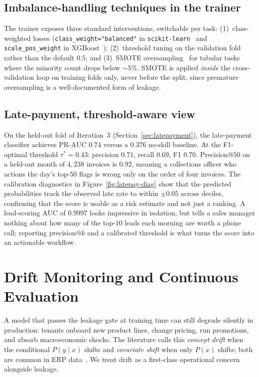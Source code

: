 \documentclass[conference]{IEEEtran}
\begin{document}
\subsection{Imbalance-handling techniques in the trainer}
The trainer exposes three standard interventions, switchable per task:
(1)~class-weighted losses (\texttt{class\_weight="balanced"} in
\texttt{scikit-learn}~\cite{pedregosa2011sklearn} and
\texttt{scale\_pos\_weight} in XGBoost~\cite{chen2016xgboost});
(2)~threshold tuning on the validation fold rather than the default $0.5$;
and (3)~SMOTE oversampling~\cite{chawla2002smote} for tabular tasks where
the minority count drops below $\sim$$5\%$. SMOTE is applied \emph{inside}
the cross-validation loop on training folds only, never before the split,
since premature oversampling is a well-documented form of leakage.

\subsection{Late-payment, threshold-aware view}
On the held-out fold of Iteration~3 (Section~\ref{sec:latepayment}), the
late-payment classifier achieves PR-AUC $0.74$ versus a $0.376$ no-skill
baseline. At the F1-optimal threshold $\tau^{*}=0.43$: precision $0.71$,
recall $0.69$, F1 $0.70$. Precision@$50$ on a held-out month of $4{,}238$
invoices is $0.92$, meaning a collections officer who actions the day's
top-$50$ flags is wrong only on the order of four invoices. The calibration
diagnostics in Figure~\ref{fig:latepay-diag} show that the predicted
probabilities track the observed late rate to within $\pm 0.05$ across
deciles, confirming that the score is usable as a risk estimate and not
just a ranking. A lead-scoring AUC of $0.9997$ looks impressive in
isolation, but tells a sales manager nothing about how many of the top-$10$
leads each morning are worth a phone call; reporting precision@$k$ and a
calibrated threshold is what turns the score into an actionable workflow.

\section{Drift Monitoring and Continuous Evaluation}
\label{sec:drift}

A model that passes the leakage gate at training time can still degrade
silently in production: tenants onboard new product lines, change pricing,
run promotions, and absorb macroeconomic shocks. The literature calls this
\emph{concept drift} when the conditional $P(y\mid x)$ shifts and
\emph{covariate shift} when only $P(x)$ shifts; both are common in ERP
data~\cite{gama2014drift,sculley2015hidden,paleyes2022challenges}. We treat
drift as a first-class operational concern alongside leakage.
\end{document}
